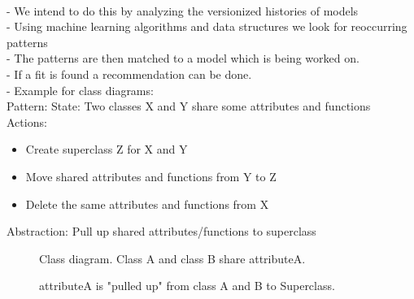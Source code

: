 \documentclass[10pt,a4paper,oneside]{scrartcl}
\begin{document}
	\\
	- We intend to do this by analyzing the versionized histories of models
	\\
	- Using machine learning algorithms and data structures we look for reoccurring patterns
	\\
	- The patterns are then matched to a model which is being worked on. 
	\\
	- If a fit is found a recommendation can be done.
	\\
	- Example for class diagrams:\\
	Pattern:
	State: Two classes X and Y share some attributes and functions\\
	Actions: \\
	\begin{itemize}
		\item Create superclass Z for X and Y
		\item Move shared attributes and functions from Y to Z
		\item Delete the same attributes and functions from X
	\end{itemize}
	Abstraction: Pull up shared attributes/functions to superclass
	\begin{center}
		\begin{figure}
			\caption{Class diagram. Class A and class B share attributeA.}
		\end{figure}
	\end{center}
	
	\begin{center}
		\begin{figure}
			\caption{attributeA is "pulled up" from class A and B to Superclass. }
		\end{figure}
	\end{center}
\end{document}
